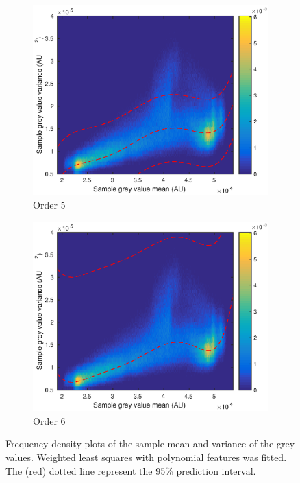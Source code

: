 \documentclass[12pt]{report}
\begin{document}
\begin{figure}
\begin{subfigure}{0.45\textwidth}
		\includegraphics[width=\textwidth]{figures/meanVar/order5.eps}
		\caption{Order 5}
	\end{subfigure}
	\begin{subfigure}{0.45\textwidth}
		\includegraphics[width=\textwidth]{figures/meanVar/order6.eps}
		\caption{Order 6}
	\end{subfigure}
	\caption{Frequency density plots of the sample mean and variance of the grey values. Weighted least squares with polynomial features was fitted. The (red) dotted line represent the 95\% prediction interval.}
	\label{fig:weightedLS_polynomials}
\end{figure}
\end{document}
